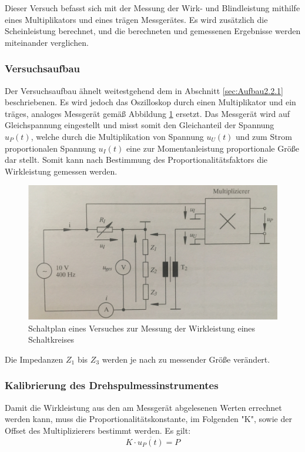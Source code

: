 Dieser Versuch befasst sich mit der Messung der Wirk- und Blindleistung mithilfe eines Multiplikators und eines trägen Messgerätes. Es wird zusätzlich die Scheinleistung berechnet, und die berechneten und gemessenen Ergebnisse werden miteinander verglichen.

\subsubsection{Versuchsaufbau}

Der Versuchsaufbau ähnelt weitestgehend dem in Abschnitt \ref{sec:Aufbau2.2.1} beschriebenen. Es wird jedoch das Oszilloskop durch einen Multiplikator und ein träges, analoges Messgerät gemäß Abbildung \ref{fig:Plan2-2} ersetzt. Das Messgerät wird auf Gleichspannung eingestellt und misst somit den Gleichanteil der Spannung $u_P(t)$, welche durch die Multiplikation von Spannung $u_U(t)$ und zum Strom proportionalen Spannung $u_I(t)$ eine zur Momentanleistung proportionale Größe dar stellt. Somit kann nach Bestimmung des Proportionalitätsfaktors die Wirkleistung gemessen werden.

\begin{figure}[H]
\centering
\includegraphics[width=0.7\linewidth]{Images/Aufbau2-2.png}
\caption{Schaltplan eines Versuches zur Messung der Wirkleistung eines Schaltkreises}
\label{fig:Plan2-2}
\end{figure}
Die Impedanzen $Z_1$ bis $Z_3$ werden je nach zu messender Größe verändert.

\subsubsection{Kalibrierung des Drehspulmessinstrumentes}
Damit die Wirkleistung aus den am Messgerät abgelesenen Werten errechnet werden kann, muss die Proportionalitätskonstante, im Folgenden "K", sowie der Offset des Multiplizierers bestimmt werden.
Es gilt:
\begin{equation}
K\cdot \overline{u_P(t)} = P
\label{eq:PropFaktor}
\end{equation}

